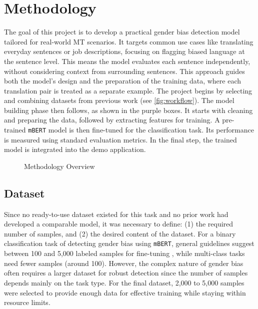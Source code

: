 \chapter{Methodology}
The goal of this project is to develop a practical gender bias detection model tailored for real-world MT scenarios. It targets common use cases like translating everyday sentences or job descriptions, focusing on flagging biased language at the sentence level. This means the model evaluates each sentence independently, without considering context from surrounding sentences. This approach guides both the model’s design and the preparation of the training data, where each translation pair is treated as a separate example. The project begins by selecting and combining datasets from previous work (see \autoref{fig:workflow}). The model building phase then follows, as shown in the purple boxes. It starts with cleaning and preparing the data, followed by extracting features for training. A pre-trained \texttt{mBERT} model is then fine-tuned for the classification task. Its performance is measured using standard evaluation metrics. In the final step, the trained model is integrated  into the demo application.

\vspace{1cm} 
\begin{figure}[htb]
    \centering
    \scalebox{0.8}{}
    \caption{Methodology Overview}
    \label{fig:workflow}
\end{figure}
\vspace{1cm} 

\section{Dataset}
    Since no ready-to-use dataset existed for this task and no prior work had developed a comparable model, it was necessary to define: (1) the required number of samples, and (2) the desired content of the dataset. For a binary classification task of detecting gender bias using \texttt{mBERT}, general guidelines suggest between 100 and 5,000 labeled samples for fine-tuning \parencite{pecherComparingSpecialisedSmall2024}, while multi-class tasks need fewer samples (around 100). However, the complex nature of gender bias often requires a larger dataset for robust detection since the number of samples depends mainly on the task type. For the final dataset, 2,000 to 5,000 samples were selected to provide enough data for effective training while staying within resource limits.

